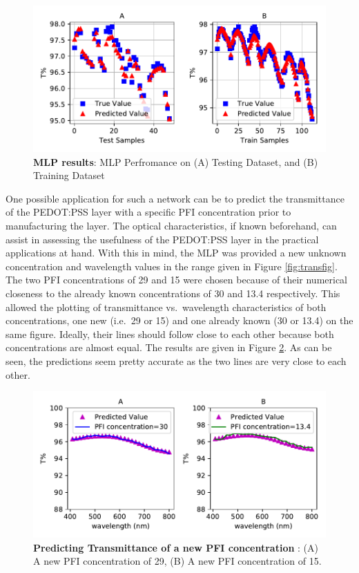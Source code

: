 \documentclass[]{article}
\begin{document}
\begin{figure}
\centering
\includegraphics{Report_files/figure-latex/transmitplot2-1.pdf}
\caption{\label{fig:transmitplot2}\textbf{MLP results}: MLP Perfromance on (A) Testing Dataset, and (B) Training Dataset}
\end{figure}

One possible application for such a network can be to predict the transmittance of the PEDOT:PSS layer with a specific PFI concentration prior to manufacturing the layer. The optical characteristics, if known beforehand, can assist in assessing the usefulness of the PEDOT:PSS layer in the practical applications at hand. With this in mind, the MLP was provided a new unknown concentration and wavelength values in the range given in Figure \ref{fig:transfig}. The two PFI concentrations of 29 and 15 were chosen because of their numerical closeness to the already known concentrations of 30 and 13.4 respectively. This allowed the plotting of transmittance vs.~wavelength characteristics of both concentrations, one new (i.e.~29 or 15) and one already known (30 or 13.4) on the same figure. Ideally, their lines should follow close to each other because both concentrations are almost equal. The results are given in Figure \ref{fig:transnew}. As can be seen, the predictions seem pretty accurate as the two lines are very close to each other.

\begin{figure}
\centering
\includegraphics{Report_files/figure-latex/transnew-1.pdf}
\caption{\label{fig:transnew}\textbf{Predicting Transmittance of a new PFI concentration }: (A) A new PFI concentration of 29, (B) A new PFI concentration of 15.}
\end{figure}
\end{document}
